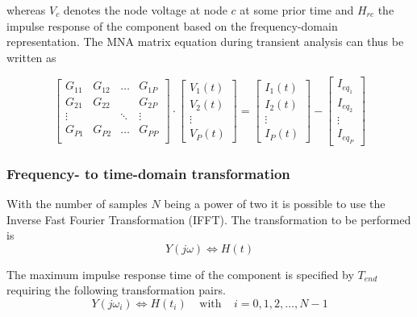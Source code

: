 whereas $V_c$ denotes the node voltage at node $c$ at some prior time
and $H_{rc}$ the impulse response of the component based on the
frequency-domain representation.  The MNA matrix equation during
transient analysis can thus be written as

\begin{equation}
\begin{bmatrix}
G_{11} & G_{12} & \ldots & G_{1P}\\
G_{21} & G_{22} &  & G_{2P}\\
\vdots &  & \ddots & \vdots\\
G_{P1} & G_{P2} & \ldots & G_{PP}\\
\end{bmatrix}
\cdot
\begin{bmatrix}
V_{1}\left(t\right)\\
V_{2}\left(t\right)\\
\vdots\\
V_{P}\left(t\right)
\end{bmatrix}
=
\begin{bmatrix}
I_{1}\left(t\right)\\
I_{2}\left(t\right)\\
\vdots\\
I_{P}\left(t\right)
\end{bmatrix}
-
\begin{bmatrix}
I_{eq_1}\\
I_{eq_2}\\
\vdots\\
I_{eq_P}
\end{bmatrix}
\end{equation}

\subsubsection{Frequency- to time-domain transformation}

With the number of samples $N$ being a power of two it is possible to
use the Inverse Fast Fourier Transformation (IFFT).  The
transformation to be performed is
\begin{equation}
Y\left(j\omega\right) \Leftrightarrow H\left(t\right)
\end{equation}

The maximum impulse response time of the component is specified by
$T_{end}$ requiring the following transformation pairs.
\begin{equation}
Y\left(j\omega_i\right) \Leftrightarrow H\left(t_i\right)
\;\;\;\; \textrm{with} \;\;\;\;
i = 0, 1, 2, \ldots, N-1
\end{equation}

